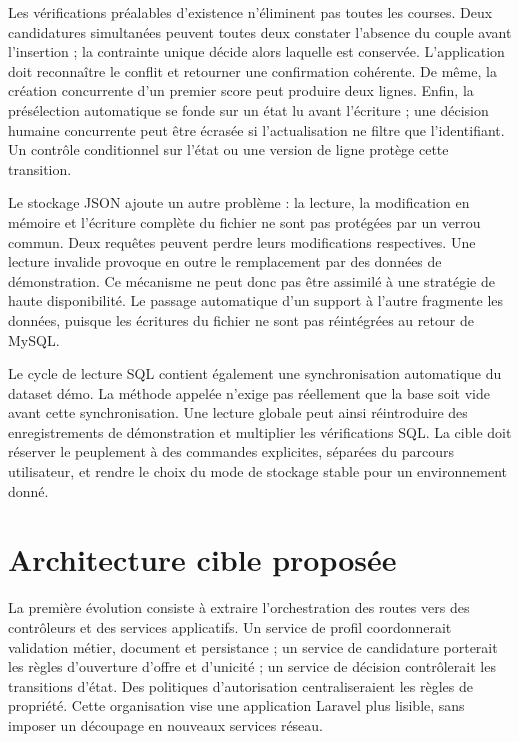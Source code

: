 Les vérifications préalables d'existence n'éliminent pas toutes les courses. Deux candidatures simultanées peuvent toutes deux constater l'absence du couple avant l'insertion ; la contrainte unique décide alors laquelle est conservée. L'application doit reconnaître le conflit et retourner une confirmation cohérente. De même, la création concurrente d'un premier score peut produire deux lignes. Enfin, la présélection automatique se fonde sur un état lu avant l'écriture ; une décision humaine concurrente peut être écrasée si l'actualisation ne filtre que l'identifiant. Un contrôle conditionnel sur l'état ou une version de ligne protège cette transition.

Le stockage JSON ajoute un autre problème : la lecture, la modification en mémoire et l'écriture complète du fichier ne sont pas protégées par un verrou commun. Deux requêtes peuvent perdre leurs modifications respectives. Une lecture invalide provoque en outre le remplacement par des données de démonstration. Ce mécanisme ne peut donc pas être assimilé à une stratégie de haute disponibilité. Le passage automatique d'un support à l'autre fragmente les données, puisque les écritures du fichier ne sont pas réintégrées au retour de MySQL.

Le cycle de lecture SQL contient également une synchronisation automatique du dataset démo. La méthode appelée  n'exige pas réellement que la base soit vide avant cette synchronisation. Une lecture globale peut ainsi réintroduire des enregistrements de démonstration et multiplier les vérifications SQL. La cible doit réserver le peuplement à des commandes explicites, séparées du parcours utilisateur, et rendre le choix du mode de stockage stable pour un environnement donné.

\section{Architecture cible proposée}

La première évolution consiste à extraire l'orchestration des routes vers des contrôleurs et des services applicatifs. Un service de profil coordonnerait validation métier, document et persistance ; un service de candidature porterait les règles d'ouverture d'offre et d'unicité ; un service de décision contrôlerait les transitions d'état. Des politiques d'autorisation centraliseraient les règles de propriété. Cette organisation vise une application Laravel plus lisible, sans imposer un découpage en nouveaux services réseau.

